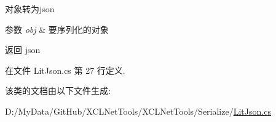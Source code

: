 对象转为json 


\begin{DoxyParams}{参数}
{\em obj} & 要序列化的对象\\
\hline
\end{DoxyParams}
\begin{DoxyReturn}{返回}
json
\end{DoxyReturn}


在文件 Lit\+Json.\+cs 第 27 行定义.



该类的文档由以下文件生成\+:\begin{DoxyCompactItemize}
\item 
D\+:/\+My\+Data/\+Git\+Hub/\+X\+C\+L\+Net\+Tools/\+X\+C\+L\+Net\+Tools/\+Serialize/\hyperlink{_lit_json_8cs}{Lit\+Json.\+cs}\end{DoxyCompactItemize}
